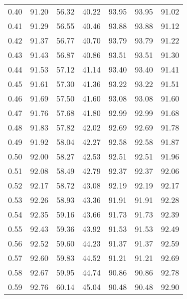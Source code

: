 \begin{tabular}{|c|c|c|c|c|c|c|}
      0.40 &     91.20 &     56.32 &      40.22 &   93.95 &      93.95 &         91.02 \\
      0.41 &     91.29 &     56.55 &      40.46 &   93.88 &      93.88 &         91.12 \\
      0.42 &     91.37 &     56.77 &      40.70 &   93.79 &      93.79 &         91.22 \\
      0.43 &     91.43 &     56.87 &      40.86 &   93.51 &      93.51 &         91.30 \\
      0.44 &     91.53 &     57.12 &      41.14 &   93.40 &      93.40 &         91.41 \\
      0.45 &     91.61 &     57.30 &      41.36 &   93.22 &      93.22 &         91.51 \\
      0.46 &     91.69 &     57.50 &      41.60 &   93.08 &      93.08 &         91.60 \\
      0.47 &     91.76 &     57.68 &      41.80 &   92.99 &      92.99 &         91.68 \\
      0.48 &     91.83 &     57.82 &      42.02 &   92.69 &      92.69 &         91.78 \\
      0.49 &     91.92 &     58.04 &      42.27 &   92.58 &      92.58 &         91.87 \\
      0.50 &     92.00 &     58.27 &      42.53 &   92.51 &      92.51 &         91.96 \\
      0.51 &     92.08 &     58.49 &      42.79 &   92.37 &      92.37 &         92.06 \\
      0.52 &     92.17 &     58.72 &      43.08 &   92.19 &      92.19 &         92.17 \\
      0.53 &     92.26 &     58.93 &      43.36 &   91.91 &      91.91 &         92.28 \\
      0.54 &     92.35 &     59.16 &      43.66 &   91.73 &      91.73 &         92.39 \\
      0.55 &     92.43 &     59.36 &      43.92 &   91.53 &      91.53 &         92.49 \\
      0.56 &     92.52 &     59.60 &      44.23 &   91.37 &      91.37 &         92.59 \\
      0.57 &     92.60 &     59.83 &      44.52 &   91.21 &      91.21 &         92.69 \\
      0.58 &     92.67 &     59.95 &      44.74 &   90.86 &      90.86 &         92.78 \\
      0.59 &     92.76 &     60.14 &      45.04 &   90.48 &      90.48 &         92.90 \\

\end{tabular}
